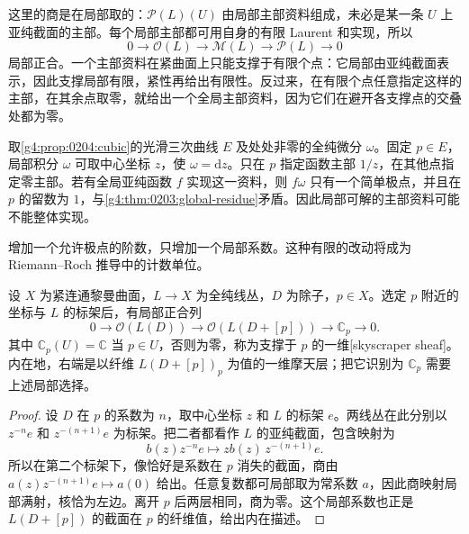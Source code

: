 这里的商是在局部取的：\(\mathcal P(L)(U)\) 由局部主部资料组成，未必是某一条 \(U\) 上亚纯截面的主部。每个局部主部都可用自身的有限 Laurent 和实现，所以
\begin{equation}\label{g4:eq:0301:principal-parts-sequence}
	0\longrightarrow\mathcal O(L)\longrightarrow
	\mathcal M(L)\longrightarrow\mathcal P(L)\longrightarrow0
\end{equation}
局部正合。一个主部资料在紧曲面上只能支撑于有限个点：它局部由亚纯截面表示，因此支撑局部有限，紧性再给出有限性。反过来，在有限个点任意指定这样的主部，在其余点取零，就给出一个全局主部资料，因为它们在避开各支撑点的交叠处都为零。

\begin{example}\label{g4:exm:0301:principal-obstruction}
	取\cref{g4:prop:0204:cubic}的光滑三次曲线 \(E\) 及处处非零的全纯微分 \(\omega\)。固定 \(p\in E\)，局部积分 \(\omega\) 可取中心坐标 \(z\)，使 \(\omega=\mathrm{d}z\)。只在 \(p\) 指定函数主部 \(1/z\)，在其他点指定零主部。若有全局亚纯函数 \(f\) 实现这一资料，则 \(f\omega\) 只有一个简单极点，并且在 \(p\) 的留数为 \(1\)，与\cref{g4:thm:0203:global-residue}矛盾。因此局部可解的主部资料可能不能整体实现。
\end{example}

增加一个允许极点的阶数，只增加一个局部系数。这种有限的改动将成为 Riemann--Roch 推导中的计数单位。

\begin{proposition}\label{g4:prop:0301:point-modification}
	设 \(X\) 为紧连通黎曼曲面，\(L\to X\) 为全纯线丛，\(D\) 为除子，\(p\in X\)。选定 \(p\) 附近的坐标与 \(L\) 的标架后，有局部正合列
	\begin{equation}\label{g4:eq:0301:point-modification}
		0\longrightarrow\mathcal O(L(D))
		\longrightarrow\mathcal O(L(D+[p]))
		\longrightarrow\mathbb C_p\longrightarrow0.
	\end{equation}
	其中 \(\mathbb C_p(U)=\mathbb C\) 当 \(p\in U\)，否则为零，称为支撑于 \(p\) 的一维[skyscraper sheaf]。内在地，右端是以纤维 \(L(D+[p])_p\) 为值的一维摩天层；把它识别为 \(\mathbb C_p\) 需要上述局部选择。
\end{proposition}
\begin{proof}
	设 \(D\) 在 \(p\) 的系数为 \(n\)，取中心坐标 \(z\) 和 \(L\) 的标架 \(e\)。两线丛在此分别以 \(z^{-n}e\) 和 \(z^{-(n+1)}e\) 为标架。把二者都看作 \(L\) 的亚纯截面，包含映射为
	\[
		b(z)z^{-n}e\longmapsto zb(z)\,z^{-(n+1)}e.
	\]
	所以在第二个标架下，像恰好是系数在 \(p\) 消失的截面，商由 \(a(z)z^{-(n+1)}e\mapsto a(0)\) 给出。任意复数都可局部取为常系数 \(a\)，因此商映射局部满射，核恰为左边。离开 \(p\) 后两层相同，商为零。这个局部系数也正是 \(L(D+[p])\) 的截面在 \(p\) 的纤维值，给出内在描述。
\end{proof}

